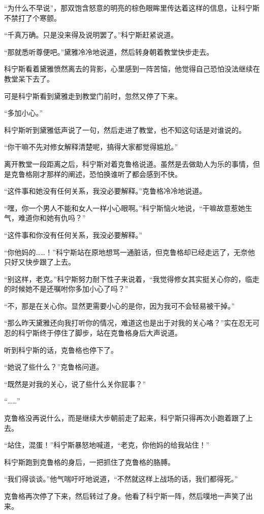 “为什么不早说”，那双饱含怒意的明亮的棕色眼眸里传达着这样的信息，让科宁斯不禁打了个寒颤。

“千真万确。只是没来得及说明罢了。”科宁斯赶紧说道。

“那就悉听尊便吧。”黛雅冷冷地说道，然后转身朝着教堂快步走去。

科宁斯看着黛雅愤然离去的背影，心里感到一阵苦恼，他觉得自己恐怕没法继续在教堂呆下去了。

可是科宁斯看到黛雅走到教堂门前时，忽然又停了下来。

“多加小心。”

科宁斯听到黛雅低声说了一句，然后走进了教堂，也不知这句话是对谁说的。

“你干嘛不先对修女解释清楚呢，搞得大家都觉得尴尬。”

离开教堂一段距离之后，科宁斯对着克鲁格说道。虽然是去做助人为乐的事情，但是克鲁格刚才那样的阐述，恐怕换谁听了都会感到不快。

“这件事和她没有任何关系，我没必要解释。”克鲁格冷冷地说道。

“嘿，你一个男人不能和女人一样小心眼啊。”科宁斯恼火地说，“干嘛故意惹她生气，难道你和她有仇吗？”

“这件事和你没有任何关系，我没必要解释。”

“你他妈的……！”科宁斯站在原地想骂一通脏话，但克鲁格却已经走远了，无奈他只好又快步跟了上去。

“别这样，老克。”科宁斯努力耐下性子来说着，“我觉得修女其实挺关心你的，临走的时候她不是还嘱咐你多加小心了吗？”

“不，那是在关心你。显然更需要小心的是你，因为我可不会轻易被干掉。”

“那么昨天黛雅还向我打听你的情况，难道这也是出于对我的关心咯？”实在忍无可忍的科宁斯终于停住了脚步，站在克鲁格身后大声说道。

听到科宁斯的话，克鲁格也停下了。

“她说了些什么？”克鲁格问道。

“既然是对我的关心，说了些什么关你屁事？”

“……”

克鲁格没再说什么，而是继续大步朝前走了起来，科宁斯只得再次小跑着跟了上去。

“站住，混蛋！”科宁斯暴怒地喊道，“老克，你他妈的给我站住！”

科宁斯跑到克鲁格的身后，一把抓住了克鲁格的胳膊。

“我们得谈谈。”他气喘吁吁地说道，“不然就这样上战场的话，我们都得死。” 

克鲁格再次停了下来，然后转过了身。他看了科宁斯一阵，然后噗地一声笑了出来。

